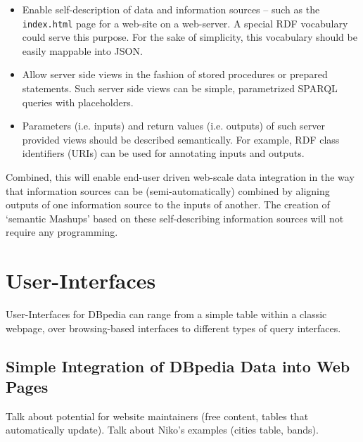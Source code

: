 \documentclass{llncs}
\begin{document}

\begin{itemize}
	\item Enable self-description of data and information sources -- such as the \verb|index.html| page for a web-site on a web-server. A special RDF vocabulary could serve this purpose. For the sake of simplicity, this vocabulary should be easily mappable into JSON.
	\item Allow server side views in the fashion of stored procedures or prepared statements. Such server side views can be simple, parametrized SPARQL\cite{sparql} queries with placeholders.
	\item Parameters (i.e. inputs) and return values (i.e. outputs) of such server provided views should be described semantically. For example, RDF class identifiers (URIs) can be used for annotating inputs and outputs.
\end{itemize}

Combined, this will enable end-user driven web-scale data integration in the way that information sources can be (semi-automatically) combined by aligning outputs of one information source to the inputs of another. The creation of `semantic Mashups' based on these self-describing information sources will not require any programming.


\section{User-Interfaces}

User-Interfaces for DBpedia can range from a simple table within a classic webpage, over browsing-based interfaces to different types of query interfaces.


\subsection{Simple Integration of DBpedia Data into Web Pages}

Talk about potential for website maintainers (free content, tables that automatically update). Talk about Niko's examples (cities table, bands). 
\end{document}
